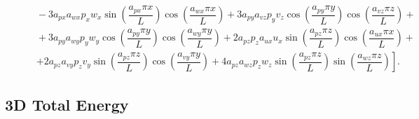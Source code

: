 \documentclass[10pt]{article}
\begin{document}
\begin{equation}
\begin{split}
    &\qquad-3 a_{px} a_{wx} p_x w_x \sin\left(\dfrac{a_{px} \pi x}{L}\right) \cos\left(\dfrac{a_{wx} \pi x}{L}\right)+3 a_{py} a_{vz} p_y v_z \cos\left(\dfrac{a_{py} \pi y}{L}\right) \cos\left(\dfrac{a_{vz} \pi z}{L}\right)+\\
    &\qquad+3 a_{py} a_{wy} p_y w_y \cos\left(\dfrac{a_{py} \pi y}{L}\right) \cos\left(\dfrac{a_{wy} \pi y}{L}\right)+2 a_{pz} p_z a_{ux} u_x \sin\left(\dfrac{a_{pz} \pi z}{L}\right) \cos\left(\dfrac{a_{ux} \pi x}{L}\right)+\\
    &\qquad\left.+2 a_{pz} a_{vy}  p_z v_y \sin\left(\dfrac{a_{pz} \pi z}{L}\right) \cos\left(\dfrac{a_{vy} \pi y}{L}\right)+4 a_{pz} a_{wz} p_z w_z \sin\left(\dfrac{a_{pz} \pi z}{L}\right) \sin\left(\dfrac{a_{wz} \pi z}{L}\right)\right].
 \end{split}
\end{equation}

\subsection{3D Total Energy}
\end{document}
